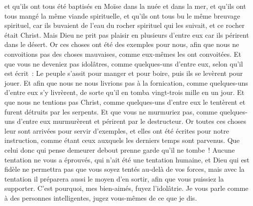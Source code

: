 \begin{multicols}{2}
et qu'ils ont tous été baptisés en Moïse dans la nuée et dans la mer,
et qu'ils ont tous mangé la même viande spirituelle,
et qu'ils ont tous bu le même breuvage spirituel, car ils buvaient de l'eau du rocher spirituel qui les suivait, et ce rocher était Christ.
Mais Dieu ne prit pas plaisir en plusieurs d'entre eux car ils périrent dans le désert.
Or ces choses ont été des exemples pour nous, afin que nous ne convoitions pas des choses mauvaises, comme eux-mêmes les ont convoitées.
Et que vous ne deveniez pas idolâtres, comme quelques-uns d'entre eux, selon qu'il est écrit~: Le peuple s'assit pour manger et pour boire, puis ils se levèrent pour jouer.
Et afin que nous ne nous livrions pas à la fornication, comme quelques-uns d'entre eux s'y livrèrent, de sorte qu'il en tomba vingt-trois mille en un jour.
Et que nous ne tentions pas Christ, comme quelques-uns d'entre eux le tentèrent et furent détruits par les serpents.
Et que vous ne murmuriez pas, comme quelques-uns d'entre eux murmurèrent et périrent par le destructeur.
Or toutes ces choses leur sont arrivées pour servir d'exemples, et elles ont été écrites pour notre instruction, comme étant ceux auxquels les derniers temps sont parvenus.
Que celui donc qui pense demeurer debout prenne garde qu'il ne tombe~!
Aucune tentation ne vous a éprouvés, qui n'ait été une tentation humaine, et Dieu qui est fidèle ne permettra pas que vous soyez tentés au-delà de vos forces, mais avec la tentation il préparera aussi le moyen d'en sortir, afin que vous puissiez la supporter.
C'est pourquoi, mes bien-aimés, fuyez l'idolâtrie.
Je vous parle comme à des personnes intelligentes, jugez vous-mêmes de ce que je dis.

\end{multicols}
